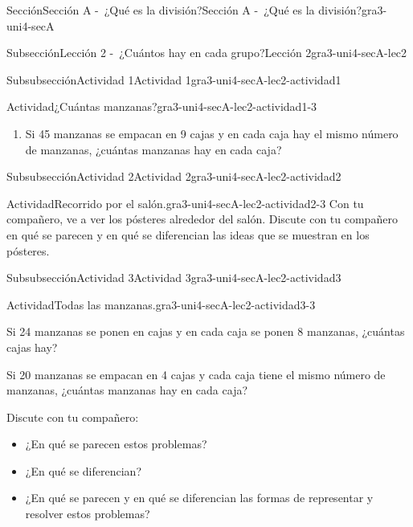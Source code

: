 \documentclass[twoside,14pt,]{extarticle}
\begin{document}
\begin{sectionptx}{Sección}{Sección A -~¿Qué es la división?}{}{Sección A -~¿Qué es la división?}{}{}{gra3-uni4-secA}
\begin{subsectionptx}{Subsección}{Lección 2 -~¿Cuántos hay en cada grupo?}{}{Lección 2}{}{}{gra3-uni4-secA-lec2}
\begin{subsubsectionptx}{Subsubsección}{Actividad 1}{}{Actividad 1}{}{}{gra3-uni4-secA-lec2-actividad1}
\begin{activity}{Actividad}{¿Cuántas manzanas?}{gra3-uni4-secA-lec2-actividad1-3}
\begin{enumerate}
\item{}Si 45 manzanas se empacan en 9 cajas y en cada caja hay el mismo número de manzanas, ¿cuántas manzanas hay en cada caja?%
\end{enumerate}
%
\end{activity}%
\end{subsubsectionptx}
%
%
\typeout{************************************************}
\typeout{************************************************}
%
\begin{subsubsectionptx}{Subsubsección}{Actividad 2}{}{Actividad 2}{}{}{gra3-uni4-secA-lec2-actividad2}
\begin{activity}{Actividad}{Recorrido por el salón.}{gra3-uni4-secA-lec2-actividad2-3}%
Con tu compañero, ve a ver los pósteres alrededor del salón. Discute con tu compañero en qué se parecen y en qué se diferencian las ideas que se muestran en los pósteres.%
\end{activity}%
\end{subsubsectionptx}
%
%
\typeout{************************************************}
\typeout{************************************************}
%
\begin{subsubsectionptx}{Subsubsección}{Actividad 3}{}{Actividad 3}{}{}{gra3-uni4-secA-lec2-actividad3}
\begin{activity}{Actividad}{Todas las manzanas.}{gra3-uni4-secA-lec2-actividad3-3}%
\begin{sidebyside}{2}{0.05}{0.05}{0.1}%
\begin{sbspanel}{0.4}%
Si 24 manzanas se ponen en cajas y en cada caja se ponen 8 manzanas, ¿cuántas cajas hay?%
\end{sbspanel}%
\begin{sbspanel}{0.4}%
\par
Si 20 manzanas se empacan en 4 cajas y cada caja tiene el mismo número de manzanas, ¿cuántas manzanas hay en cada caja?%
\end{sbspanel}%
\end{sidebyside}%
\par
Discute con tu compañero:%
\par
%
\begin{itemize}[label=\textbullet]
\item{}¿En qué se parecen estos problemas?%
\item{}¿En qué se diferencian?%
\item{}¿En qué se parecen y en qué se diferencian las formas de representar y resolver estos problemas?%

\end{itemize}
\end{activity}
\end{subsubsectionptx}
\end{subsectionptx}
\end{sectionptx}
\end{document}
